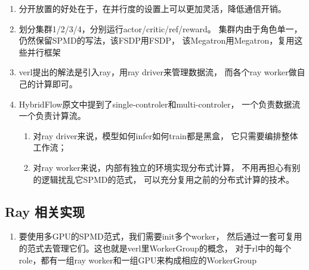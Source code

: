 \documentclass[UTF8,fontset=fandol]{ctexart}
\begin{document}
\begin{enumerate}
  \item 分开放置的好处在于，在并行度的设置上可以更加灵活，降低通信开销。
  \item 划分集群1/2/3/4，分别运行actor/critic/ref/reward。
    集群内由于角色单一，仍然保留SPMD的写法，该FSDP用FSDP，
    该Megatron用Megatron，复用这些并行框架
  \item verl提出的解法是引入ray，用ray driver来管理数据流，
    而各个ray worker做自己的计算即可。
  \item HybridFlow原文中提到了single-controler和multi-controler，
    一个负责数据流一个负责计算流。
  \begin{enumerate}
    \item 对ray driver来说，模型如何infer如何train都是黑盒，
      它只需要编排整体工作流；
    \item 对ray worker来说，内部有独立的环境实现分布式计算，
      不用再担心有别的逻辑扰乱它SPMD的范式，
      可以充分复用之前的分布式计算的技术。
  \end{enumerate}
\end{enumerate}

\subsection{Ray 相关实现}

\begin{enumerate}
  \item 要使用多GPU的SPMD范式，我们需要init多个worker，
    然后通过一套可复用的范式去管理它们。这也就是verl里WorkerGroup的概念，
    对于rl中的每个role，都有一组ray worker和一组GPU来构成相应的WorkerGroup
\end{enumerate}

\end{document}
